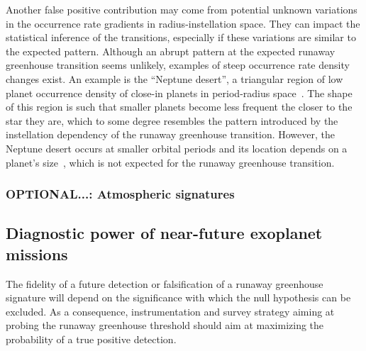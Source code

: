 \documentclass[twocolumn,twocolappendix]{aastex631}
\begin{document}
Another false positive contribution may come from potential unknown variations in the occurrence rate gradients in radius-instellation space.
They can impact the statistical inference of the transitions, especially if these variations are similar to the expected pattern.
Although an abrupt pattern at the expected runaway greenhouse transition seems unlikely, examples of steep occurrence rate density changes exist.
An example is the ``Neptune desert'', a triangular region of low planet occurrence density of close-in planets in period-radius space~\citep{Szabo2011,Mazeh2016,Dreizler2020b}.
The shape of this region is such that smaller planets become less frequent the closer to the star they are, which to some degree resembles the pattern introduced by the instellation dependency of the runaway greenhouse transition.
However, the Neptune desert occurs at smaller orbital periods and its location depends on a planet's size~\citep{Szabo2011}, which is not expected for the runaway greenhouse transition.


\subsubsection{OPTIONAL...: Atmospheric signatures}\label{sec:dis_atmospheres}


\subsection{Diagnostic power of near-future exoplanet missions}\label{sec:dis_samplesize}
The fidelity of a future detection or falsification of a runaway greenhouse signature will depend on the significance with which the null hypothesis can be excluded.
As a consequence, instrumentation and survey strategy aiming at probing the runaway greenhouse threshold should aim at maximizing the probability of a true positive detection.
\end{document}
